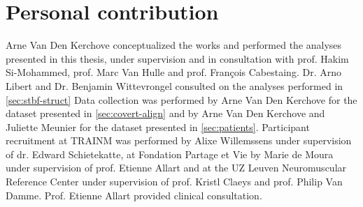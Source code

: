 \chapter*{Personal contribution}
Arne Van Den Kerchove conceptualized the works and performed the analyses
presented in
this thesis, under supervision and in consultation with prof. Hakim Si-Mohammed,
prof. Marc Van Hulle and prof. François Cabestaing.
Dr. Arno Libert and Dr. Benjamin Wittevrongel consulted on the analyses performed in
\cref{sec:stbf-struct}
Data collection was performed by Arne Van Den Kerchove for the dataset
presented in \cref{sec:covert-align} and by Arne Van Den Kerchove and
Juliette Meunier for the dataset presented in \cref{sec:patients}.
Participant recruitment at TRAINM was performed by Alixe Willemssens under
supervision of dr. Edward Schietekatte, at Fondation Partage et Vie by Marie de
Moura under supervision of prof. Etienne Allart and at the UZ Leuven Neuromuscular
Reference Center under supervision of prof. Kristl Claeys and prof. Philip Van Damme.
Prof. Etienne Allart provided clinical consultation.
